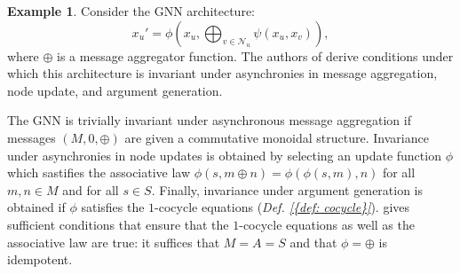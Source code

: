 \documentclass[11pt,a4paper,openright,twoside]{report}
\theoremstyle{plain}
\theoremstyle{definition}
\newtheorem{example}[proposition]{Example}
\begin{document}
\begin{example}
  Consider the GNN architecture:
  \[x_u' = \phi\left(x_u, \bigoplus_{v \in \mathcal{N}_u}\psi(x_{u},x_{v})\right),\]
  where $\oplus$ is a message aggregator function. The authors of \cite{dudzik2024asynchronous} derive conditions under which this architecture is invariant under asynchronies in message aggregation, node update, and argument generation.


  The GNN is trivially invariant under asynchronous message aggregation if messages $(M,0,\oplus)$ are given a commutative monoidal structure. Invariance under asynchronies in node updates is obtained by selecting an update function $\phi$ which sastifies the associative law $\phi(s,m \oplus n) = \phi(\phi(s,m),n)$ for all $m,n \in M$ and for all $s \in S$. Finally, invariance under argument generation is obtained if $\phi$ satisfies the $1$-cocycle equations (\textit{Def. \ref{{def: cocycle}}}). \cite{dudzik2024asynchronous} gives sufficient conditions that ensure that the $1$-cocycle equations as well as the associative law are true: it suffices that $M=A=S$ and that $\phi=\oplus$ is idempotent.
\end{example}
\end{document}
